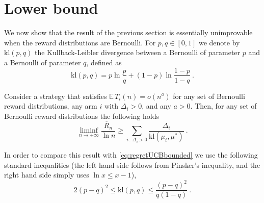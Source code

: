\documentclass[11pt]{hackednow}
\newcommand{\kl}{\mathrm{kl}}
\newcommand{\E}{\mathbb{E}}
\newcommand{\oR}{\overline{R}}
\begin{document}
\section{Lower bound}
\label{s:stoch-lower}
We now show that the result of the previous section is essentially unimprovable when the reward distributions are Bernoulli. For $p, q \in [0,1]$ we denote by $\kl(p,q)$ the Kullback-Leibler divergence between a Bernoulli of parameter $p$ and a Bernoulli of parameter $q$, defined as
$$\kl(p,q) =p \ln\frac{p}{q} + (1-p) \ln\frac{1-p}{1-q}~.$$
\begin{theorem} \label{th:LR85}
Consider a strategy that satisfies $\E\,T_i(n) = o(n^a)$ for any set of Bernoulli reward distributions, any arm $i$ with $\Delta_i > 0$, and any $a>0$. 
Then, for any set of Bernoulli reward distributions the following holds
$$\liminf_{n \to +\infty} \frac{\oR_n}{\ln n} \geq \sum_{i \,:\, \Delta_i > 0} \frac{\Delta_i}{\kl(\mu_i,\mu^*)}~.$$
\end{theorem}
In order to compare this result with \eqref{eq:regretUCBbounded} we use the following standard inequalities (the left hand side follows from Pinsker's inequality, and the right hand side simply uses $\ln x \leq x -1$),
\begin{equation} \label{eq:klbernoullis}
2 (p-q)^2 \leq \kl(p,q) \leq \frac{(p-q)^2}{q(1-q)}~.
\end{equation}
\end{document}

